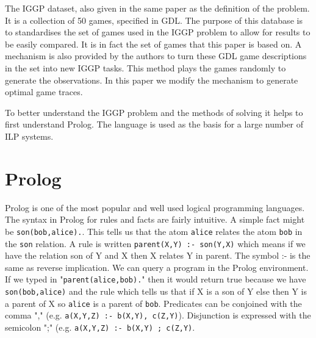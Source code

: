 The IGGP dataset, also given in the same paper as the definition of the problem. It is a collection of 50 games, specified in GDL. The purpose of this database is to standardises the set of games used in the IGGP problem to allow for results to be easily compared. It is in fact the set of games that this paper is based on.
A mechanism is also provided by the authors to turn these GDL game descriptions in the set into new IGGP tasks. This method plays the games randomly to generate the observations. In this paper we modify the mechanism to generate optimal game traces.

To better understand the IGGP problem and the methods of solving it helps to first understand Prolog. The language is used as the basis for a large number of ILP systems\cite{Metagol/Github,Muggleton/Aleph,Ahlgren/Atom}.


\section{Prolog}\label{sec:prolog}
Prolog is one of the most popular and well used logical programming languages. The syntax in Prolog for rules and facts are fairly intuitive. A simple fact might be \texttt{son(bob,alice).}. This tells us that the atom \texttt{alice} relates the atom \texttt{bob} in the \texttt{son} relation. A rule is written \texttt{parent(X,Y) :- son(Y,X)} which means if we have the relation son of Y and X then X relates Y in parent. The symbol :- is the same as reverse implication. We can query a program in the Prolog environment. If we typed in "\texttt{parent(alice,bob).}" then it would return true because we have \texttt{son(bob,alice)} and the rule which tells us that if X is a son of Y else then Y is a parent of X so \texttt{alice} is a parent of \texttt{bob}. Predicates can be conjoined with the comma "," (e.g. \texttt{a(X,Y,Z) :- b(X,Y), c(Z,Y)}). Disjunction is expressed with the semicolon ";" (e.g. \texttt{a(X,Y,Z) :- b(X,Y) ; c(Z,Y)}\cite{Bratko}.

